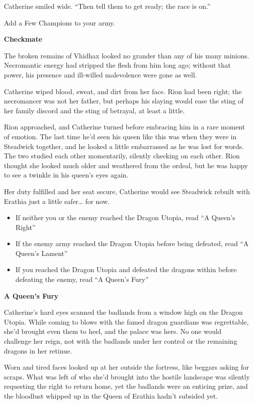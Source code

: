 \begin{multicols*}{2}
Catherine smiled wide.
``Then tell them to get ready; the race is on.''

\textcolor{darkcandyapplered}{Add a Few Champions to your army.}

\textbf{Checkmate}

The broken remains of Vhidhax looked no grander than any of his many minions.
Necromantic energy had stripped the flesh from him long ago; without that power, his presence and ill-willed malevolence were gone as well.

Catherine wiped blood, sweat, and dirt from her face.
Rion had been right; the necromancer was not her father, but perhaps his slaying would ease the sting of her family discord and the sting of betrayal, at least a little.

Rion approached, and Catherine turned before embracing him in a rare moment of emotion.
The last time he'd seen his queen like this was when they were in Steadwick together, and he looked a little embarrassed as he was lost for words.
The two studied each other momentarily, silently checking on each other.
Rion thought she looked much older and weathered from the ordeal, but he was happy to see a twinkle in his queen's eyes again.

Her duty fulfilled and her seat secure, Catherine would see Steadwick rebuilt with Erathia just a little safer… for now.

\begin{itemize}
    \item \textcolor{darkcandyapplered}{If neither you or the enemy reached the Dragon Utopia, read ``A Queen's Right''}
    \item \textcolor{darkcandyapplered}{If the enemy army reached the Dragon Utopia before being defeated, read ``A Queen's Lament''}
    \item \textcolor{darkcandyapplered}{If you reached the Dragon Utopia and defeated the dragons within before defeating the enemy, read ``A Queen's Fury''}
\end{itemize}

\textbf{A Queen's Fury}

Catherine's hard eyes scanned the badlands from a window high on the Dragon Utopia.
While coming to blows with the famed dragon guardians was regrettable, she'd brought even them to heel, and the palace was hers.
No one would challenge her reign, not with the badlands under her control or the remaining dragons in her retinue.

Worn and tired faces looked up at her outside the fortress, like beggars asking for scraps.
What was left of who she'd brought into the hostile landscape was silently requesting the right to return home, yet the badlands were an enticing prize, and the bloodlust whipped up in the Queen of Erathia hadn't subsided yet.


\end{multicols*}
